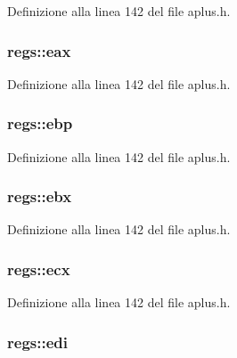 Definizione alla linea 142 del file aplus.\+h.

\hypertarget{structregs_a8fa1f22a8e8ac6908cc7710c8396f9dc}{
\subsubsection[{eax}]{ regs\+::eax}}\label{structregs_a8fa1f22a8e8ac6908cc7710c8396f9dc}


Definizione alla linea 142 del file aplus.\+h.

\hypertarget{structregs_a1b38213d82714658dfd95ba5427f7f7b}{
\subsubsection[{ebp}]{ regs\+::ebp}}\label{structregs_a1b38213d82714658dfd95ba5427f7f7b}


Definizione alla linea 142 del file aplus.\+h.

\hypertarget{structregs_a41a7a63387c4bb590af33d8ee3cb5a42}{
\subsubsection[{ebx}]{ regs\+::ebx}}\label{structregs_a41a7a63387c4bb590af33d8ee3cb5a42}


Definizione alla linea 142 del file aplus.\+h.

\hypertarget{structregs_a63c6a54e49cb7c0035440d0fda58a63b}{
\subsubsection[{ecx}]{ regs\+::ecx}}\label{structregs_a63c6a54e49cb7c0035440d0fda58a63b}


Definizione alla linea 142 del file aplus.\+h.

\hypertarget{structregs_a2b436d52440963797508f228cd45c207}{
\subsubsection[{edi}]{ regs\+::edi}}\label{structregs_a2b436d52440963797508f228cd45c207}


